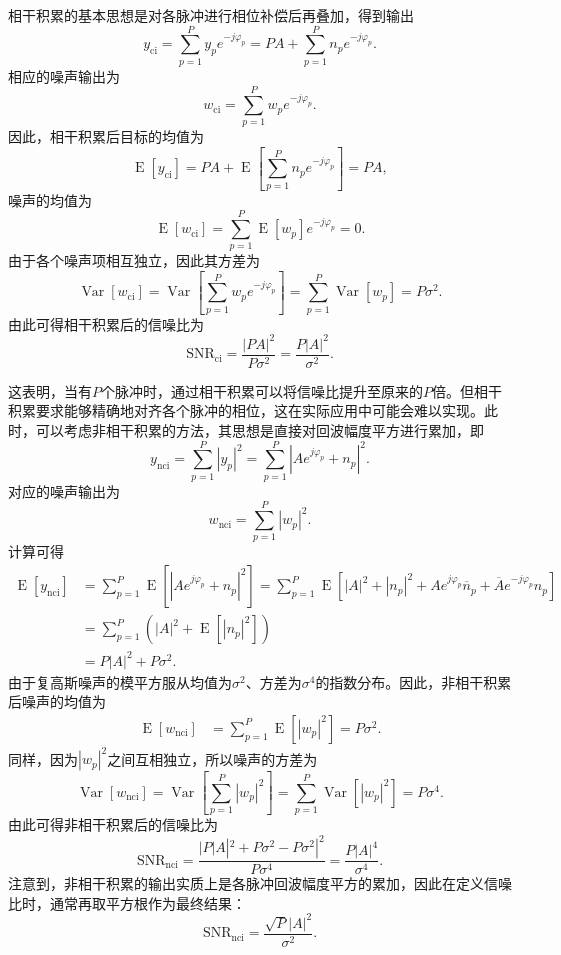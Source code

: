 相干积累的基本思想是对各脉冲进行相位补偿后再叠加，得到输出
\[
    y_{\mathrm{ci}} = \sum_{p=1}^P y_p e^{-j \varphi_p} = PA + \sum_{p=1}^P n_p e^{-j \varphi_p}.
\]
相应的噪声输出为
\[
    w_{\mathrm{ci}} = \sum_{p=1}^P w_p e^{-j \varphi_p}.
\]
因此，相干积累后目标的均值为
\[
    \operatorname{E}[y_{\mathrm{ci}}] = PA + \operatorname{E}\left[ \sum_{p=1}^P n_p e^{-j \varphi_p} \right] = PA,
\]
噪声的均值为
\[
    \operatorname{E}[w_{\mathrm{ci}}] = \sum_{p=1}^P \operatorname{E}[w_p] e^{-j \varphi_p} = 0.
\]
由于各个噪声项相互独立，因此其方差为
\[
    \operatorname{Var}[w_{\mathrm{ci}}] =\operatorname{Var}\left[\sum_{p=1}^P w_p e^{-j \varphi_p} \right] = \sum_{p=1}^P \operatorname{Var}[w_p] = P \sigma^2.
\]
由此可得相干积累后的信噪比为
\[
    \mathrm{SNR}_{\mathrm{ci}} = \frac{|PA|^2}{P \sigma^2} = \frac{P|A|^2}{\sigma^2}.
\]

这表明，当有\( P \)个脉冲时，通过相干积累可以将信噪比提升至原来的\( P \)倍。但相干积累要求能够精确地对齐各个脉冲的相位，这在实际应用中可能会难以实现。此时，可以考虑非相干积累的方法，其思想是直接对回波幅度平方进行累加，即
\[
    y_{\mathrm{nci}} = \sum_{p=1}^P |y_p|^2 = \sum_{p=1}^P \left| A e^{j \varphi_p} + n_p \right|^2.
\]
对应的噪声输出为
\[
    w_{\mathrm{nci}} = \sum_{p=1}^P |w_p|^2.
\]
计算可得
\[
    \begin{split}
        \operatorname{E}[y_{\mathrm{nci}}] & = \sum_{p=1}^P \operatorname{E}\left[ |A e^{j \varphi_p} + n_p|^2 \right] = \sum_{p=1}^P \operatorname{E} \left[ |A|^2 + |n_p|^2 + A e^{j \varphi_p} \overline{n}_p + \overline{A} e^{-j \varphi_p} n_p \right] \\
                                           & = \sum_{p=1}^P \left( |A|^2 + \operatorname{E}[|n_p|^2] \right)                                                                                                                                                 \\
                                           & = P |A|^2 + P \sigma^2.
    \end{split}
\]
由于复高斯噪声的模平方服从均值为\( \sigma^2 \)、方差为\( \sigma^4 \)的指数分布。因此，非相干积累后噪声的均值为
\[
    \begin{split}
        \operatorname{E}[w_{\mathrm{nci}}] & = \sum_{p=1}^P \operatorname{E}\left[ |w_p|^2 \right] = P \sigma^2.
    \end{split}
\]
同样，因为\( |w_p|^2 \)之间互相独立，所以噪声的方差为
\[
    \operatorname{Var}[w_{\mathrm{nci}}] = \operatorname{Var}\left[ \sum_{p=1}^P |w_p|^2\right] = \sum_{p=1}^P \operatorname{Var}\left[ |w_p|^2\right] = P \sigma^4.
\]
由此可得非相干积累后的信噪比为
\[
    \mathrm{SNR}_{\mathrm{nci}} = \frac{|P |A|^2 + P \sigma^2 - P \sigma^2|^2}{P \sigma^4} = \frac{P |A|^4}{\sigma^4}.
\]
注意到，非相干积累的输出实质上是各脉冲回波幅度平方的累加，因此在定义信噪比时，通常再取平方根作为最终结果：
\[
    \mathrm{SNR}_{\mathrm{nci}} = \frac{\sqrt{P} |A|^2}{\sigma^2}.
\]

